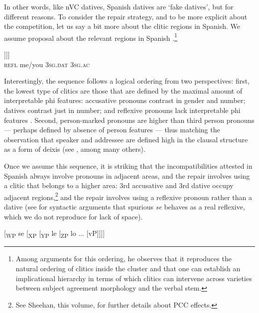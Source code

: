 \documentclass[output=paper,modfonts,nonflat,newtxmath,colorlinks,citecolor=brown]{langsci/langscibook}
\begin{document}
In other words, like nVC datives, Spanish datives are ‘fake datives’, but for different reasons. To consider the repair strategy, and to be more explicit about the competition, let us say a bit more about the clitic regions in Spanish. We assume \citet{Kayne2010} proposal about the relevant regions in Spanish .\footnote{Among \citet{Kayne2010} arguments for this ordering, he observes that it reproduces the natural ordering of clitics inside the cluster and that one can establish an implicational hierarchy in terms of which clitics can intervene across varieties between subject agreement morphology and the verbal stem.}   

\ea%
    \label{ex:cabre:22}
    \gll  [\textsubscript{WP}  se  [\textsubscript{XP}  me/te  [\textsubscript{YP}  le  [\textsubscript{ZP}  lo ... [vP]]]] \\
    { } \textsc{refl} { } me/you {} \textsc{3sg.dat} { } \textsc{3sg.ac}  \\
    \glt
    \z

        
    
Interestingly, the sequence follows a logical ordering from two perspectives: first, the lowest type of clitics are those that are defined by the maximal amount of interpretable phi features: accusative pronouns contrast in gender and number; datives contrast just in number; and reflexive pronouns lack interpretable phi features \citep{Reuland2011}. Second, person{}-marked pronouns are higher than third person pronouns — perhaps defined by absence of person features — thus matching the observation that speaker and addressee are defined high in the clausal structure as a form of deixis (see \citealt{Giorgi2009}, among many others). 

Once we assume this sequence, it is striking that the incompatibilities attested in Spanish always involve pronouns in adjacent areas, and the repair involves using a clitic that belongs to a higher area: 3rd accusative and 3rd dative occupy adjacent regions,\footnote{See Sheehan, this volume, for further details about PCC effects.} and the repair involves using a reflexive pronoun rather than a dative (see \citealt{Alcaraz2017} for syntactic arguments that spurious \textit{se} behaves as a real reflexive, which we do not reproduce for lack of space).

\ea  %
   {[}\textsubscript{WP}  se  [\textsubscript{XP}  [\textsubscript{YP}  le  [\textsubscript{ZP}  lo ... [vP]{]]]} 
   
    \label{ex:cabre:23}
    \z
\end{document}
